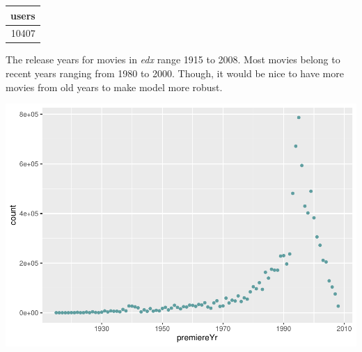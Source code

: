 \documentclass[]{article}
\newenvironment{Shaded}{\begin{snugshade}}{\end{snugshade}}
\newcommand{\CommentTok}[1]{\textcolor[rgb]{0.56,0.35,0.01}{\textit{#1}}}
\newcommand{\DataTypeTok}[1]{\textcolor[rgb]{0.13,0.29,0.53}{#1}}
\newcommand{\KeywordTok}[1]{\textcolor[rgb]{0.13,0.29,0.53}{\textbf{#1}}}
\newcommand{\NormalTok}[1]{#1}
\newcommand{\OperatorTok}[1]{\textcolor[rgb]{0.81,0.36,0.00}{\textbf{#1}}}
\newcommand{\StringTok}[1]{\textcolor[rgb]{0.31,0.60,0.02}{#1}}
\begin{document}
\begin{Shaded}
\end{Shaded}

\begin{longtable}[]{@{}r@{}}
\toprule
users\tabularnewline
\midrule
\endhead
10407\tabularnewline
\bottomrule
\end{longtable}

The release years for movies in \emph{edx} range 1915 to 2008. Most
movies belong to recent years ranging from 1980 to 2000. Though, it
would be nice to have more movies from old years to make model more
robust.

\begin{Shaded}
\end{Shaded}

\includegraphics{Project_MovieLens_files/figure-latex/unnamed-chunk-10-1.pdf}
\end{document}

